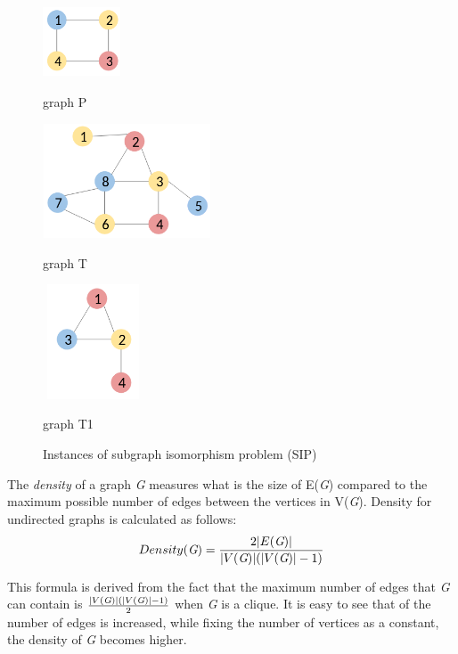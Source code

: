 \documentclass{l4proj}
\newcounter{example}[section]
\begin{document}
\begin{figure}[H]
\centering
\begin{minipage}[t]{.3\textwidth}
  \centering
  \includegraphics[height=2.1cm,width=2.3cm]{images/graphs/exampleGraph2.png}
  \caption{graph P}
  \label{fig:exampleGraph2}
\end{minipage}%
\begin{minipage}[t]{.4\textwidth}
  \centering
  \includegraphics[height=3.4cm,width=5cm]{images/graphs/exampleGraph.png}
  \caption{graph T}
  \label{fig:exampleGraph1}
\end{minipage}%
\begin{minipage}[t]{.3\textwidth}
  \centering
  \includegraphics[height=3.4cm,width=3cm]{images/graphs/smalltarget.png}
  \caption{graph T1}
  \label{fig:exampleGraph3}
\end{minipage}%
\caption{Instances of subgraph isomorphism problem (SIP)}
\label{fig:SIP}
\end{figure}

The \emph{density} of a graph \emph{G} measures what is the size of E(\emph{G}) compared to the maximum possible number of edges between the vertices in V(\emph{G}). Density for undirected graphs is calculated as follows:
\begin{equation}
\label{eq:graphdensity}
Density (\emph{G}) = \frac{2 \* |E(\emph{G})|}{|V(\emph{G})|(|V(\emph{G})| - 1)}
\end{equation}

This formula is derived from the fact that the maximum number of edges that \emph{G} can contain is $\frac{|V(\emph{G})|(|V(\emph{G})| - 1)}{2}$ when \emph{G} is a clique. It is easy to see that of the number of edges is increased, while fixing the number of vertices as a constant, the density of \emph{G} becomes higher.
\end{document}

